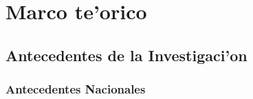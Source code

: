 
\chapter{Marco te'orico}

\section{Antecedentes de la Investigaci'on}

\subsection{Antecedentes Nacionales}

